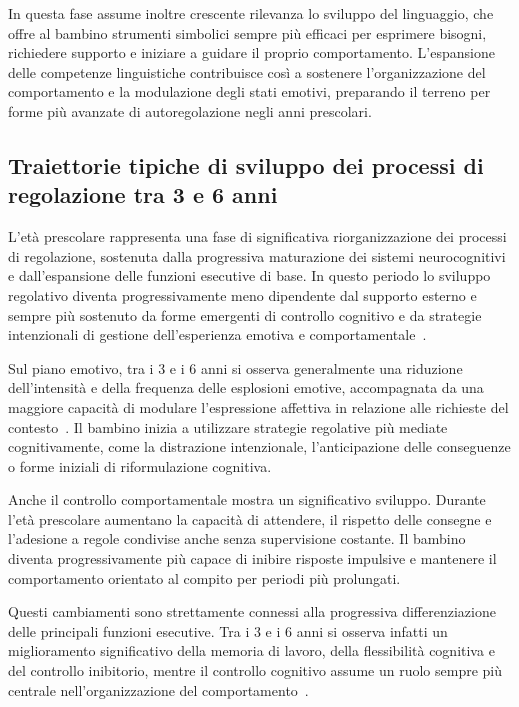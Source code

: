             In questa fase assume inoltre crescente rilevanza lo sviluppo del linguaggio, che offre al bambino strumenti simbolici sempre più efficaci per esprimere bisogni, richiedere supporto e iniziare a guidare il proprio comportamento. L'espansione delle competenze linguistiche contribuisce così a sostenere l'organizzazione del comportamento e la modulazione degli stati emotivi, preparando il terreno per forme più avanzate di autoregolazione negli anni prescolari.

        \subsection{Traiettorie tipiche di sviluppo dei processi di regolazione tra 3 e 6 anni}
        \label{sec:1_6_2}

            L'età prescolare rappresenta una fase di significativa riorganizzazione dei processi di regolazione, sostenuta dalla progressiva maturazione dei sistemi neurocognitivi e dall'espansione delle funzioni esecutive di base. In questo periodo lo sviluppo regolativo diventa progressivamente meno dipendente dal supporto esterno e sempre più sostenuto da forme emergenti di controllo cognitivo e da strategie intenzionali di gestione dell'esperienza emotiva e comportamentale~\cite{blair2010,diamond2013}.

            Sul piano emotivo, tra i 3 e i 6 anni si osserva generalmente una riduzione dell'intensità e della frequenza delle esplosioni emotive, accompagnata da una maggiore capacità di modulare l'espressione affettiva in relazione alle richieste del contesto~\cite{eisenberg2010}. Il bambino inizia a utilizzare strategie regolative più mediate cognitivamente, come la distrazione intenzionale, l'anticipazione delle conseguenze o forme iniziali di riformulazione cognitiva.

            Anche il controllo comportamentale mostra un significativo sviluppo. Durante l'età prescolare aumentano la capacità di attendere, il rispetto delle consegne e l'adesione a regole condivise anche senza supervisione costante. Il bambino diventa progressivamente più capace di inibire risposte impulsive e mantenere il comportamento orientato al compito per periodi più prolungati.

            Questi cambiamenti sono strettamente connessi alla progressiva differenziazione delle principali funzioni esecutive. Tra i 3 e i 6 anni si osserva infatti un miglioramento significativo della memoria di lavoro, della flessibilità cognitiva e del controllo inibitorio, mentre il controllo cognitivo assume un ruolo sempre più centrale nell'organizzazione del comportamento~\cite{diamond2013,blair2015}.

